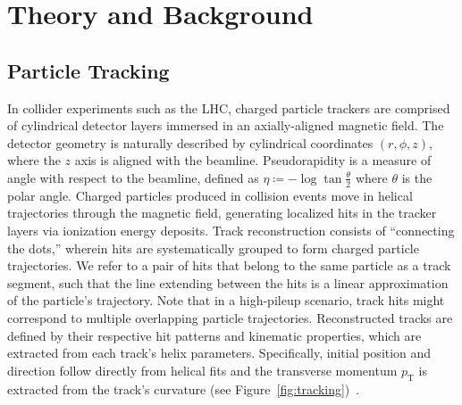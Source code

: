\documentclass[twocolumn]{svjour3}
\newcommand{\pt}{\ensuremath{p_{\mathrm{T}}}\xspace}
\begin{document}
\section{Theory and Background }
\label{sec:theory}

\subsection{Particle Tracking} 
\label{sec-2.1}

In collider experiments such as the LHC, charged particle trackers are comprised of cylindrical detector layers immersed in an axially-aligned magnetic field. 
The detector geometry is naturally described by cylindrical coordinates $(r,\phi,z)$, where the $z$ axis is aligned with the beamline. 
Pseudorapidity is a measure of angle with respect to the beamline, defined as $\eta\coloneqq-\log\tan\frac{\theta}{2}$ where $\theta$ is the polar angle.
Charged particles produced in collision events move in helical trajectories through the magnetic field, generating localized hits in the tracker layers via ionization energy deposits. 
Track reconstruction consists of ``connecting the dots,'' wherein hits are systematically grouped to form charged particle trajectories. 
We refer to a pair of hits that belong to the same particle as a track segment, such that the line extending between the hits is a linear approximation of the particle's trajectory. 
Note that in a high-pileup scenario, track hits might correspond to multiple overlapping particle trajectories. 
Reconstructed tracks are defined by their respective hit patterns and kinematic properties, which are extracted from each track's helix parameters. 
Specifically, initial position and direction follow directly from helical fits and the transverse momentum $\pt$ is extracted from the track's curvature (see Figure~\ref{fig:tracking})~\cite{tracking}. 
\end{document}
